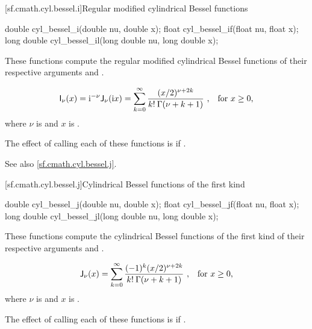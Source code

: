 [sf.cmath.cyl.bessel.i]{Regular modified cylindrical Bessel functions}%
%
%
%
%
%
\begin{itemdecl}
double       cyl_bessel_i(double nu, double x);
float        cyl_bessel_if(float nu, float x);
long double  cyl_bessel_il(long double nu, long double x);
\end{itemdecl}

\begin{itemdescr}
\pnum
\effects
These functions compute
the regular modified cylindrical Bessel functions
of their respective arguments
 and .

\pnum
\returns
\[ \mathsf{I}_\nu(x) =
     \mathrm{i}^{-\nu} \mathsf{J}_\nu(\mathrm{i}x) =
     \sum_{k=0}^\infty \frac{(x/2)^{\nu+2k}}{k! \: \Gamma(\nu+k+1)}
     \text{ ,\quad for $x \ge 0$,} \]
where
$\nu$ is  and
$x$ is .

\pnum
\remarks
The effect of calling each of these functions
is 
if .

\pnum
See also \ref{sf.cmath.cyl.bessel.j}.
\end{itemdescr}

[sf.cmath.cyl.bessel.j]{Cylindrical Bessel functions of the first kind}%
%
%
%
%
%
\begin{itemdecl}
double       cyl_bessel_j(double nu, double x);
float        cyl_bessel_jf(float nu, float x);
long double  cyl_bessel_jl(long double nu, long double x);
\end{itemdecl}

\begin{itemdescr}

\pnum\effects
These functions compute
the cylindrical Bessel functions of the first kind
of their respective arguments
 and .

\pnum\returns
\[ \mathsf{J}_\nu(x) =
   \sum_{k=0}^\infty \frac{(-1)^k (x/2)^{\nu+2k}}{k! \: \Gamma(\nu+k+1)}
   \text{ ,\quad for $x \ge 0$,} \]
where
$\nu$ is  and
$x$ is .

\pnum\remarks
The effect of calling each of these functions
is 
if .
\end{itemdescr}


